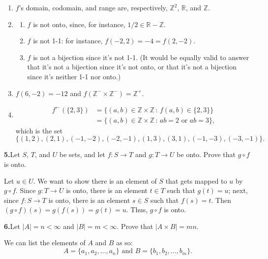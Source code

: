 \documentclass[10pt,]{book}
\theoremstyle{plain}
\theoremstyle{definition}
\theoremstyle{definition}
\theoremstyle{definition}
\theoremstyle{definition}
\numberwithin{equation}{section}
\def\Z{\mathbb{Z}}
\def\R{\mathbb{R}}
\newcommand{\lt}{<}
\newcommand{\amp}{&}
\begin{document}
\begin{enumerate}[label=(\alph*)]
\item\hypertarget{li-46}{}\(f\)'s domain, codomain, and range are, respectively, \(\Z^2\), \(\R\), and \(\Z\).%
\item\hypertarget{li-47}{}%
\begin{enumerate}[label=\roman*.]
\item\hypertarget{li-48}{}\(f\) is not onto, since, for instance, \(1/2\in \R-\Z\).%
\item\hypertarget{li-49}{}\(f\) is not 1-1: for instance, \(f(-2,2)=-4=f(2,-2)\).%
\item\hypertarget{li-50}{}\(f\) is not a bijection since it's not 1-1. (It would be equally valid to answer that it's not a bijection since it's not onto, or that it's not a bijection since it's neither 1-1 nor onto.)%
\end{enumerate}
%
\item\hypertarget{li-51}{}\(f(6,-2)=-12\) and \(f(\Z^-\times \Z^-)=\Z^+\).%
\item\hypertarget{li-52}{}%
\begin{align*}
f^{\leftarrow}(\{2,3\})\amp =\{(a,b)\in \Z\times \Z\,:\, f(a,b)\in \{2,3\}\}\\
\amp =\{(a,b)\in \Z\times \Z\,:\, ab=2 \mbox{ or }  ab=3\},
\end{align*}
which is the set%
\begin{equation*}
\{(1,2),(2,1),(-1,-2),(-2,-1),(1,3),(3,1),(-1,-3),(-3,-1)\}.
\end{equation*}
%
\end{enumerate}
\par\smallskip
\noindent\textbf{5.}\quad{}Let \(S\), \(T\), and \(U\) be sets, and let \(f: S\to T\) and \(g: T\to U\) be onto. Prove that \(g \circ f\) is onto.%
\par\smallskip
Let \(u\in U\). We want to show there is an element of \(S\) that gets mapped to \(u\) by \(g\circ f\). Since \(g:T\to U\) is onto, there is an element \(t\in T\) such that \(g(t)=u\); next, since \(f:S\to T\) is onto, there is an element \(s\in S\) such that \(f(s)=t\). Then \((g\circ f)(s)=g(f(s))=g(t)=u\). Thus, \(g\circ f\) is onto.%
\par\smallskip
\noindent\textbf{6.}\quad{}Let \(|A|=n\lt \infty\) and \(|B|=m\lt  \infty\). Prove that \(|A\times B|=mn\).%
\par\smallskip
We can list the elements of \(A\) and \(B\) as so:%
\begin{equation*}
A=\{a_1,a_2,\ldots, a_n\} \mbox{ and } B=\{b_1,b_2,\ldots, b_m\}.
\end{equation*}
\end{document}
